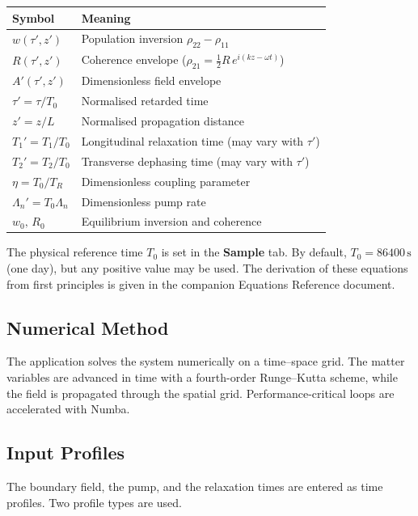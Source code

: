 \documentclass[12pt,a4paper]{article}
\newcommand{\tab}[1]{\textbf{#1}}
\newcommand{\T}{T_0}
\begin{document}
\begin{center}
\begin{tabular}{@{}ll@{}}
  \toprule
  Symbol & Meaning \\
  \midrule
  $w(\tau',z')$              & Population inversion $\rho_{22}-\rho_{11}$ \\
  $R(\tau',z')$              & Coherence envelope ($\rho_{21} = \tfrac{1}{2}R\,e^{i(kz-\omega t)}$) \\
  $A'(\tau',z')$             & Dimensionless field envelope \\
  $\tau' = \tau/\T$          & Normalised retarded time \\
  $z' = z/L$                 & Normalised propagation distance \\
  $T_1' = T_1/\T$            & Longitudinal relaxation time (may vary with $\tau'$) \\
  $T_2' = T_2/\T$            & Transverse dephasing time (may vary with $\tau'$) \\
  $\eta = \T/T_R$            & Dimensionless coupling parameter \\
  $\Lambda_n' = \T\Lambda_n$ & Dimensionless pump rate \\
  $w_0,\,R_0$                & Equilibrium inversion and coherence \\
  \bottomrule
\end{tabular}
\end{center}

The physical reference time $\T$ is set in the \tab{Sample} tab.
By default, $\T = 86400\,\mathrm{s}$ (one day), but any positive value
may be used. The derivation of these equations from first principles is
given in the companion Equations Reference document.
\subsection{Numerical Method}

The application solves the system numerically on a time--space grid. The matter variables are advanced
in time with a fourth-order Runge--Kutta scheme, while the field is propagated through the spatial grid.
Performance-critical loops are accelerated with Numba.

\subsection{Input Profiles}
\label{sec:profiles}

The boundary field, the pump, and the relaxation times are entered as
time profiles. Two profile types are used.
\end{document}
